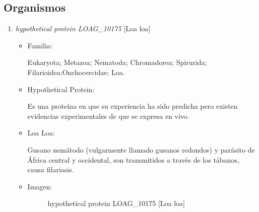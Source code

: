 %
\subsection{Organismos}

\begin{enumerate}
	\item \emph{hypothetical protein LOAG\_10175} $[$Loa loa$]$~\cite{match2}
	\begin{itemize}
		\item Familia:

			Eukaryota; Metazoa; Nematoda; Chromadorea; Spirurida; Filarioidea;Onchocercidae; Loa.
		\item Hypothetical Protein:

			Es una proteína en que su experiencia ha sido predicha pero existen evidencias experimentales de que se expresa en vivo.
		\item Loa Loa:

			Gusano nemátodo (vulgarmente llamado gusanos redondos) y parásito de África central y occidental, son transmitidos a través de los tábanos, causa filariasis.
		\item Imagen:

			\begin{figure}[!h]
				  \label{fig:match2}
				  \caption{hypothetical protein LOAG\_10175 $[$Loa loa$]$}
		\end{figure}
	\end{itemize}



\end{enumerate}
